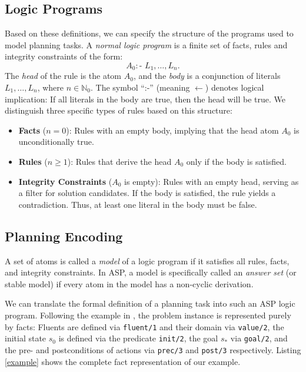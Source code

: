 \documentclass[
     11pt,                    %
     a4paper,             %
     BCOR=10mm,     %
     DIV=14,                 %
     listof=totoc,                    %
     bibliography=totoc,       %
     index=totoc,              %
     parskip            %
     twoside,
     headsepline
     ]{scrreprt}
\theoremstyle{definition}
\theoremstyle{definition}
\theoremstyle{remark}
\theoremstyle{bfnote}
\begin{document}
\subsection*{Logic Programs}
Based on these definitions, we can specify the structure of the programs used to model planning tasks. A \textit{normal logic program} is a finite set of facts, rules and integrity constraints of the form:
\[
    A_0 :\text{- } L_1, \dots, L_n.
\]
The \textit{head} of the rule is the atom $A_0$, and the \textit{body} is a conjunction of literals $L_1, \dots, L_n$, where $n \in \mathbb N_0$. The symbol \enquote{:-} (meaning $\leftarrow$) denotes logical implication: If all literals in the body are true, then the head will be true.
We distinguish three specific types of rules based on this structure:
\begin{itemize}
    \item \textbf{Facts} ($n=0$): Rules with an empty body, implying that the head atom $A_0$ is unconditionally true.
    \item \textbf{Rules} ($n \ge 1$): Rules that derive the head $A_0$ only if the body is satisfied.
    \item \textbf{Integrity Constraints} ($A_0$ is empty): Rules with an empty head, serving as a filter for solution candidates. If the body is satisfied, the rule yields a contradiction. Thus, at least one literal in the body must be false.
\end{itemize}

\subsection*{Planning Encoding}
A set of atoms is called a \textit{model} of a logic program if it satisfies all rules, facts, and integrity constraints. In ASP, a model is specifically called an \textit{answer set} (or stable model) if every atom in the model has a non-cyclic derivation.

We can translate the formal definition of a planning task into such an ASP logic program. Following the example in \textcite{DIMOPOULOS_2019}, the problem instance is represented purely by facts:
Fluents are defined via \texttt{fluent/1} and their domain via \texttt{value/2}, the initial state $s_0$ is defined via the predicate \texttt{init/2}, the goal $s_*$ via \texttt{goal/2}, and the pre- and postconditions of actions via \texttt{prec/3} and \texttt{post/3} respectively.
Listing \ref{example} shows the complete fact representation of our example.
\end{document}

